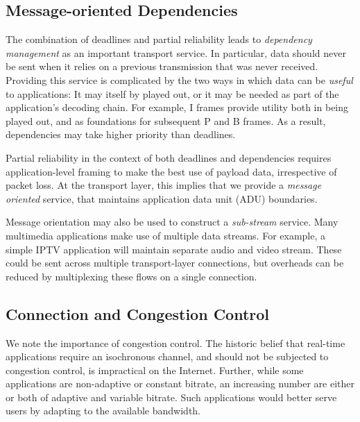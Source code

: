 \documentclass[10pt]{sig-alternate-05-2015}
\begin{document}
\subsection{Message-oriented Dependencies}

The combination of deadlines and partial reliability leads to \emph{dependency
management} as an important transport service.
In particular, data should never be sent when it relies on a previous
transmission that was never received. Providing this service is complicated by
the two ways in which data can be \emph{useful} to applications: It may itself
by played out, or it may be needed as part of the application's decoding chain.
For example, I frames provide utility both in being played out, and as
foundations for subsequent P and B frames. As a result, dependencies may take
higher priority than deadlines.

Partial reliability in the context of both deadlines and dependencies
requires application-level framing \cite{clark:1990:architecture} to
make the best use of payload data, irrespective of packet loss. At the transport
layer, this implies that we provide a \emph{message oriented} service, that
maintains application data unit (ADU) boundaries.

Message orientation may also be used to construct a \emph{sub-stream} service.
Many multimedia applications make use of multiple data streams. For example, a
simple IPTV application will maintain separate audio and video stream. These
could be sent across multiple transport-layer connections, but overheads can be
reduced by multiplexing these flows on a single connection.

\subsection{Connection and Congestion Control}

We note the importance of congestion control. %
The historic belief that real-time applications require an isochronous channel,
and should not be subjected to congestion control, is impractical on the
Internet. Further, while some applications are non-adaptive or constant bitrate,
an increasing number are either or both of adaptive and variable bitrate. Such
applications would better serve users by adapting to the available bandwidth.
\end{document}
